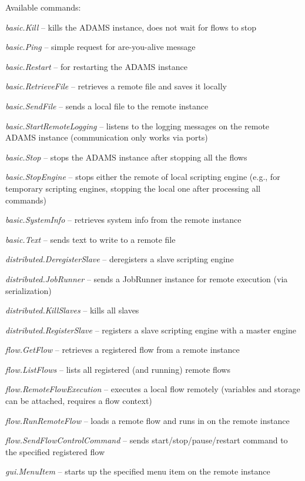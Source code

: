Available commands:
\begin{tight_itemize}
  \item \textit{basic.Kill} -- kills the ADAMS instance, does not wait for flows
  to stop
  \item \textit{basic.Ping} -- simple request for are-you-alive message
  \item \textit{basic.Restart} -- for restarting the ADAMS instance
  \item \textit{basic.RetrieveFile} -- retrieves a remote file and saves it locally
  \item \textit{basic.SendFile} -- sends a local file to the remote instance
  \item \textit{basic.StartRemoteLogging} -- listens to the logging messages on the
  remote ADAMS instance (communication only works via ports)
  \item \textit{basic.Stop} -- stops the ADAMS instance after stopping all the flows
  \item \textit{basic.StopEngine} -- stops either the remote of local scripting engine
  (e.g., for temporary scripting engines, stopping the local one after processing
  all commands)
  \item \textit{basic.SystemInfo} -- retrieves system info from the remote instance
  \item \textit{basic.Text} -- sends text to write to a remote file
  \item \textit{distributed.DeregisterSlave} -- deregisters a slave scripting engine
  \item \textit{distributed.JobRunner} -- sends a JobRunner instance for remote
  execution (via serialization)
  \item \textit{distributed.KillSlaves} -- kills all slaves
  \item \textit{distributed.RegisterSlave} -- registers a slave scripting engine
  with a master engine
  \item \textit{flow.GetFlow} -- retrieves a registered flow from a remote instance
  \item \textit{flow.ListFlows} -- lists all registered (and running) remote flows
  \item \textit{flow.RemoteFlowExecution} -- executes a local flow remotely
  (variables and storage can be attached, requires a flow context)
  \item \textit{flow.RunRemoteFlow} -- loads a remote flow and runs in on the
  remote instance
  \item \textit{flow.SendFlowControlCommand} -- sends start/stop/pause/restart
  command to the specified registered flow
  \item \textit{gui.MenuItem} -- starts up the specified menu item on the
  remote instance
\end{tight_itemize}

